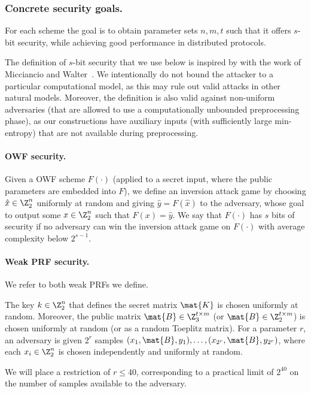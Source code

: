 \subsubsection{Concrete security goals.}
For each scheme the goal is to obtain parameter sets $n,m,t$ such that it offers
$s$-bit security, while achieving good performance in distributed protocols.

The definition of $s$-bit security that we use below is inspired
by with the work of Micciancio and Walter~\cite{Micciancio018}.
We intentionally do not bound the attacker to a particular computational model,
as this may rule out valid attacks in other natural models.
Moreover, the definition is also valid against non-uniform adversaries
(that are allowed to use a computationally unbounded preprocessing phase),
as our constructions have auxiliary inputs
(with sufficiently large min-entropy) that are not available during preprocessing.

\paragraph{OWF security.}
Given a OWF scheme $F(\cdot)$ (applied to a secret input, where the public parameters are embedded into $F$),
we define an inversion attack game by choosing $\hat{x} \in \Z_2^n$
uniformly at random and giving $\hat{y}= F(\hat{x})$ to the adversary, whose
goal to output some $x \in \Z_2^n$ such that $F(x) = \hat{y}$.
We say that $F(\cdot)$ has $s$ bits of security if no adversary can win the inversion attack game on $F(\cdot)$ with average complexity below $2^{s-1}$.


\paragraph{Weak PRF security.}
We refer to both weak PRFs we define.

The key $k \in \Z_2^n$ that defines the secret matrix $\mat{K}$ is chosen uniformly at random.
Moreover, the public matrix
$\mat{B} \in \Z_3^{t \times m}$ (or $\mat{B} \in \Z_2^{t \times m}$) is chosen uniformly at random
(or as a random Toeplitz matrix).
For a parameter $r$, an adversary is given $2^{r}$ samples $(x_1,\mat{B},y_1) ,\ldots, (x_{2^r},
\mat{B},y_{2^r})$,
where each $x_i \in \Z_2^n$ is chosen independently and uniformly at random.

We will place a restriction of $r \leq 40$,
corresponding to a practical limit of $2^{40}$ on the number of samples available to the adversary.

